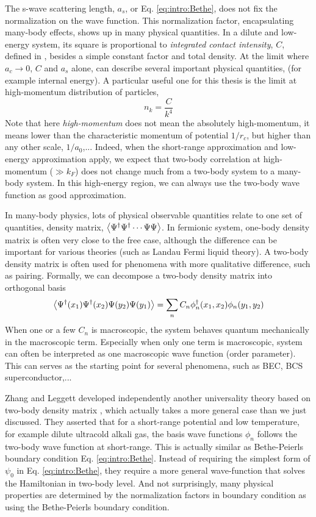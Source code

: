  The s-wave scattering length, $a_s$, or Eq. \ref{eq:intro:Bethe}, does not fix the normalization on the wave function. This normalization factor, encapsulating many-body effects, shows up in many physical quantities.  In a dilute and low-energy system,  its square is proportional to  \emph{integrated contact intensity}, $C$, defined in \cite{ Tan2008-1,Tan2008-2,CombescotTan}, besides a simple constant factor and total density.  At the limit where $a_c\to0$, $C$ and $a_s$ alone, can describe several important physical quantities, (for example internal energy).  A particular useful one for this thesis is the limit at high-momentum distribution of particles, 
 \begin{equation}
 n_k=\frac{C}{k^4}
 \end{equation}
 Note that here \emph{high-momentum} does not mean the absolutely high-momentum, it means lower than the characteristic momentum of potential $1/r_c$, but higher than any other scale, $1/a_0$,...  
 Indeed, when the short-range approximation and low-energy approximation apply, we expect that two-body correlation at  high-momentum ($\gg{k_{F}}$) does not change much from a two-body system to a many-body system.  In this high-energy region, we can always use   the two-body wave function as good approximation. 
 
 In many-body physics, lots of physical observable quantities relate to one set of  quantities, density matrix, $\bigl<{\Psi^{\dagger}\Psi^{\dagger}\cdots\Psi\Psi}\bigr>$. In fermionic system,  one-body density matrix is often very close to the free case, although the difference can be important for various theories (such as Landau Fermi liquid theory).  A two-body density matrix is often  used for phenomena with  more qualitative difference, such as pairing. Formally, we can decompose a two-body density matrix into orthogonal basis
 \begin{equation}
 \bigl<{\Psi^{\dagger}(x_1)\Psi^{\dagger}(x_2)\Psi(y_2)\Psi(y_1)}\bigr>=\sum_nC_n\phi_n^{\dagger}(x_1,x_2)\phi_n(y_1,y_2)
 \end{equation}     
 When one or a few $C_n$ is macroscopic, the system behaves quantum mechanically in the macroscopic term.  Especially when only one term is macroscopic, system can often be interpreted as one macroscopic wave function (order parameter).\cite{Leggett}  This can serves as the starting point for several phenomena, such as BEC, BCS superconductor,...
 
Zhang and Leggett developed independently another universality theory based on two-body density matrix \linebreak[2] \cite{shizhongUniv}, which actually takes a more general case than we just discussed.   They asserted that for a short-range potential and low temperature, for example dilute ultracold alkali gas, the basis wave functions $\phi_n$ follows the two-body wave function at short-range. This is actually similar as Bethe-Peierls boundary condition Eq. \ref{eq:intro:Bethe}.  Instead of requiring the simplest form of $\psi_0$ in Eq. \eqref{eq:intro:Bethe}, they require a more general wave-function that solves the  Hamiltonian in two-body level.  And not surprisingly, many physical properties are determined by the normalization factors in boundary condition as using the Bethe-Peierls boundary condition.  

